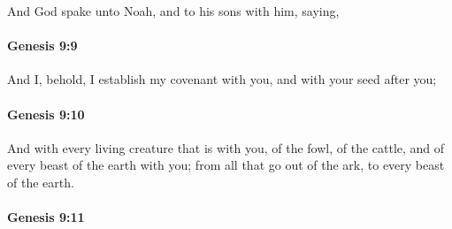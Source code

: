 			And God spake unto Noah, and to his sons with him, saying,


		\paragraph{Genesis 9:9} %
			\label{GENESIS-9-9}

			And I, behold, I establish my covenant with you, and with your seed after you;


		\paragraph{Genesis 9:10} %
			\label{GENESIS-9-10}

			And with every living creature that is with you, of the fowl, of the cattle, and of every beast of the earth with you; from all that go out of the ark, to every beast of the earth.


		\paragraph{Genesis 9:11} %
			\label{GENESIS-9-11}

